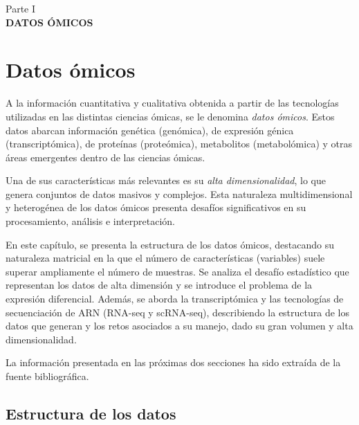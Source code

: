 \newpage
\thispagestyle{empty}
\vspace*{\fill}
\begin{center}
    \large Parte I \\
    \vspace{0.5cm}           
    \LARGE \textbf{DATOS ÓMICOS}
\end{center}
\vspace*{\fill}
\newpage
\setcounter{page}{1}  %

\newpage

\chapter{Datos ómicos}
\setcounter{page}{\value{page}}  %


A la información cuantitativa y cualitativa obtenida a partir de las tecnologías utilizadas
en las distintas ciencias ómicas, se le denomina \textit{datos ómicos}. Estos datos abarcan 
información genética (genómica), de expresión génica (transcriptómica), de proteínas (proteómica),
metabolitos (metabolómica) y otras áreas emergentes dentro de las ciencias ómicas.

Una de sus características más relevantes es su \textit{alta dimensionalidad}, lo que genera conjuntos de datos 
masivos y complejos. Esta naturaleza multidimensional y heterogénea de los datos ómicos presenta 
desafíos significativos en su procesamiento, análisis e interpretación.

En este capítulo, se presenta la estructura de los datos ómicos, destacando su naturaleza matricial en la que 
el número de características (variables) suele superar ampliamente el número de muestras. Se analiza el desafío 
estadístico que representan los datos de alta dimensión y se introduce el problema de la expresión diferencial. 
Además, se aborda la transcriptómica y las tecnologías de secuenciación de ARN (RNA-seq y scRNA-seq), describiendo 
la estructura de los datos que generan y los retos asociados a su manejo, dado su gran volumen y alta dimensionalidad.

La información presentada en las próximas dos secciones ha sido extraída de la fuente bibliográfica\cite{Ayala2023}.

\section{Estructura de los datos}

